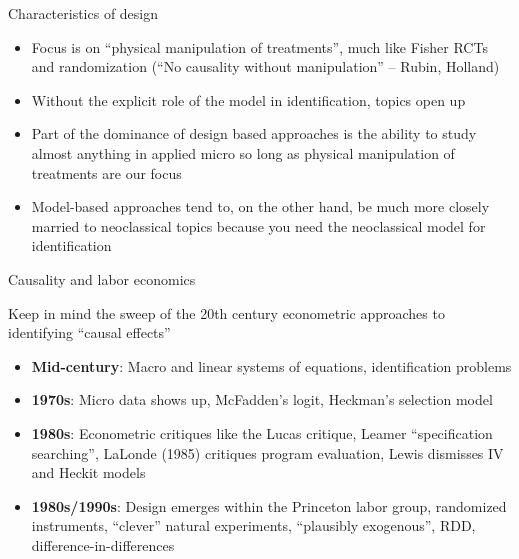 \documentclass{beamer}
\begin{document}
\begin{frame}{Characteristics of design}

\begin{itemize}
\item Focus is on ``physical manipulation of treatments'', much like Fisher RCTs and randomization (``No causality without manipulation'' -- Rubin, Holland)
\item Without the explicit role of the model in identification, topics open up 
\item Part of the dominance of design based approaches is the ability to study almost anything in applied micro so long as physical manipulation of treatments are our focus
\item Model-based approaches tend to, on the other hand, be much more closely married to neoclassical topics because you need the neoclassical model for identification
\end{itemize}

\end{frame}

\begin{frame}{Causality and labor economics}

Keep in mind the sweep of the 20th century econometric approaches to identifying ``causal effects''
\begin{itemize}
\item \textbf{Mid-century}: Macro and linear systems of equations, identification problems 
\item \textbf{1970s}: Micro data shows up, McFadden's logit, Heckman's selection model
\item \textbf{1980s}: Econometric critiques like the Lucas critique, Leamer ``specification searching'', LaLonde (1985) critiques program evaluation, Lewis dismisses IV and Heckit models
\item \textbf{1980s/1990s}: Design emerges within the Princeton labor group, randomized instruments, ``clever'' natural experiments, ``plausibly exogenous'', RDD, difference-in-differences
\end{itemize}

\end{frame}
\end{document}
